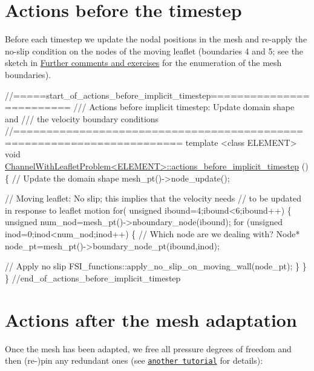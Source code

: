  

\hypertarget{index_timestep}{}\section{Actions before the timestep}\label{index_timestep}
Before each timestep we update the nodal positions in the mesh and re-\/apply the no-\/slip condition on the nodes of the moving leaflet (boundaries 4 and 5; see the sketch in \hyperlink{index_comm_and_ex}{Further comments and exercises} for the enumeration of the mesh boundaries).


\begin{DoxyCodeInclude}
\textcolor{comment}{//=====start\_of\_actions\_before\_implicit\_timestep=========================}
\textcolor{comment}{/// Actions before implicit timestep: Update domain shape and}
\textcolor{comment}{}\textcolor{comment}{/// the velocity boundary conditions}
\textcolor{comment}{}\textcolor{comment}{//=======================================================================}
\textcolor{keyword}{template} <\textcolor{keyword}{class} ELEMENT> 
\textcolor{keywordtype}{void} \hyperlink{classChannelWithLeafletProblem_acef6ec771775162f77295a8f92d695ac}{ChannelWithLeafletProblem<ELEMENT>::actions\_before\_implicit\_timestep}
      ()
\{
 \textcolor{comment}{// Update the domain shape}
 mesh\_pt()->node\_update();

 \textcolor{comment}{// Moving leaflet: No slip; this implies that the velocity needs}
 \textcolor{comment}{// to be updated in response to leaflet motion}
 \textcolor{keywordflow}{for}( \textcolor{keywordtype}{unsigned} ibound=4;ibound<6;ibound++)
  \{
   \textcolor{keywordtype}{unsigned} num\_nod=mesh\_pt()->nboundary\_node(ibound);
   \textcolor{keywordflow}{for} (\textcolor{keywordtype}{unsigned} inod=0;inod<num\_nod;inod++)
    \{
     \textcolor{comment}{// Which node are we dealing with?}
     Node* node\_pt=mesh\_pt()->boundary\_node\_pt(ibound,inod);
     
     \textcolor{comment}{// Apply no slip}
     FSI\_functions::apply\_no\_slip\_on\_moving\_wall(node\_pt);
    \}
  \}
\} \textcolor{comment}{//end\_of\_actions\_before\_implicit\_timestep}

\end{DoxyCodeInclude}




 

\hypertarget{index_adapt}{}\section{Actions after the mesh adaptation}\label{index_adapt}
Once the mesh has been adapted, we free all pressure degrees of freedom and then (re-\/)pin any redundant ones (see \href{../../../navier_stokes/adaptive_driven_cavity/html/index.html}{\tt another tutorial} for details)\+:


